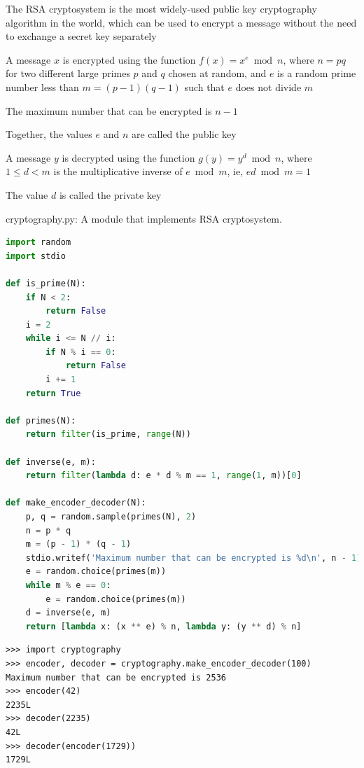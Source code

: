 \documentclass[8pt,a4paper,compress]{beamer}
\begin{document}
\begin{frame}[fragile]
\pause

The RSA cryptosystem is the most widely-used public key cryptography algorithm in the world, which can be used to encrypt a message without the need to exchange a secret key separately

\pause
\bigskip

A message $x$ is encrypted using the function $f(x) = x^e \bmod n$, where $n=pq$ for two different large primes $p$ and $q$ chosen at random, and $e$ is a random prime number less than $m=(p-1)(q-1)$ such that $e$ does not divide $m$

\pause
\bigskip

The maximum number that can be encrypted is $n-1$

\pause
\bigskip

Together, the values $e$ and $n$ are called the public key

\pause
\bigskip

A message $y$ is decrypted using the function $g(y) = y^d \bmod n$, where $1 \leq d < m$ is the multiplicative inverse of $e \bmod m$, ie, $ed \bmod m = 1$

\pause
\bigskip

The value $d$ is called the private key
\end{frame}

\begin{frame}[fragile]
\pause

\begin{framed}
\tiny cryptography.py: A module that implements RSA cryptosystem.
\end{framed}

\begin{lstlisting}[language=Python]
import random
import stdio

def is_prime(N):
    if N < 2: 
        return False
    i = 2
    while i <= N // i:
        if N % i == 0:
            return False
        i += 1
    return True

def primes(N):
    return filter(is_prime, range(N))

def inverse(e, m):
    return filter(lambda d: e * d % m == 1, range(1, m))[0]

def make_encoder_decoder(N):
    p, q = random.sample(primes(N), 2)
    n = p * q
    m = (p - 1) * (q - 1)
    stdio.writef('Maximum number that can be encrypted is %d\n', n - 1)
    e = random.choice(primes(m))
    while m % e == 0:
        e = random.choice(primes(m))
    d = inverse(e, m)
    return [lambda x: (x ** e) % n, lambda y: (y ** d) % n]
\end{lstlisting}
\end{frame}

\begin{frame}[fragile]
\pause

\begin{lstlisting}[language={}]
>>> import cryptography
>>> encoder, decoder = cryptography.make_encoder_decoder(100)
Maximum number that can be encrypted is 2536
>>> encoder(42)
2235L
>>> decoder(2235)
42L
>>> decoder(encoder(1729))
1729L
\end{lstlisting}
\end{frame}
\end{document}
